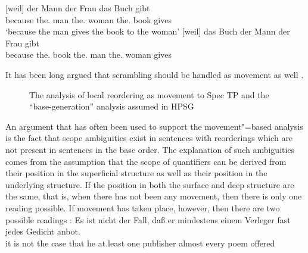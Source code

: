\documentclass[output=paper,biblatex,babelshorthands,newtxmath,draftmode,colorlinks,citecolor=brown]{langscibook}
\begin{document}
\eal
\label{ex-gb-umstellung}
\ex 
\gll {}[weil] der Mann der Frau das Buch gibt\\
     \spacebr{}because the.\nom{} man the.\dat{} woman the.\acc{} book gives\\
\glt `because the man gives the book to the woman'
\ex\label{ex-das-buch-der-mann-der-frau-gibt} 
\gll {}[weil] das Buch der Mann der Frau gibt\\
     \spacebr{}because the.\acc{} book the.\nom{} man the.\dat{} woman gives\\
\zl

\largerpage[-1]
\noindent
It has been long argued that scrambling should be handled as movement as well \citep{Frey93a}.
\begin{figure}
\hfill
{}
\caption{The analysis of local reordering as movement to Spec TP and the ``base-generation'' analysis
  assumed in HPSG}\label{fig-das-buch-der-mann-der-frau-gibt-movement}
\end{figure}%
%
An argument that has often been used to support the movement"=based analysis is the fact that scope ambiguities
exist in sentences with reorderings which are not present in sentences in the base order. The
explanation of such ambiguities comes from the assumption that the scope of quantifiers can be
derived from their position in the superficial structure as well as their position in the underlying
structure. If the position in both the surface and deep structure are the same, that is, when there
has not been any movement, then there is only one reading possible. If movement has taken place,
however, then there are two possible readings \citep[]{Frey93a}:
\eal
\ex 
\gll Es ist nicht der Fall, daß er mindestens einem Verleger fast jedes Gedicht anbot.\\
     it is not the case that he at.least one publisher almost every poem offered\\
\end{document}
